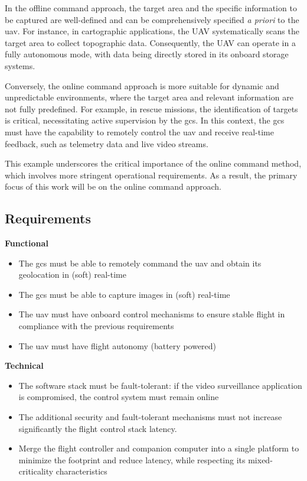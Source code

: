 In the offline command approach, the target area and the specific information to
be captured are well-defined and can be comprehensively specified \emph{a
priori} to the \gls{uav}. For instance, in cartographic applications, the UAV
systematically scans the target area to collect topographic data. Consequently,
the UAV can operate in a fully autonomous mode, with data being directly stored
in its onboard storage systems.

Conversely, the online command approach is more suitable for dynamic and
unpredictable environments, where the target area and relevant information are
not fully predefined. For example, in rescue missions, the identification of
targets is critical, necessitating active supervision by the \gls{gcs}. In this
context, the \gls{gcs} must have the capability to remotely control the \gls{uav} and receive real-time feedback, such as telemetry data and live video streams.

This example underscores the critical importance of the online command method,
which involves more stringent operational requirements. As a result, the primary
focus of this work will be on the online command approach.

\subsection{Requirements}
\label{sec:req}

\textbf{Functional}
  \begin{itemize}
    \item The \gls{gcs} must be able to remotely command the \gls{uav} and
obtain its geolocation in (soft) real-time 
    \item The \gls{gcs} must be able to capture images in (soft) real-time
    \item The \gls{uav} must have onboard control mechanisms to ensure stable
flight in compliance with the previous requirements
    \item The \gls{uav} must have flight autonomy (battery powered) 
    \end{itemize}


\textbf{Technical}
  \begin{itemize}
    \item The software stack must be fault-tolerant: if the video surveillance
application is compromised, the control system must remain online 
    \item The additional security and fault-tolerant mechanisms must not
increase significantly the flight control stack latency.
\item Merge the flight controller and companion computer into a single platform
to minimize the footprint and reduce latency, while respecting its
mixed-criticality characteristics
    \end{itemize}

